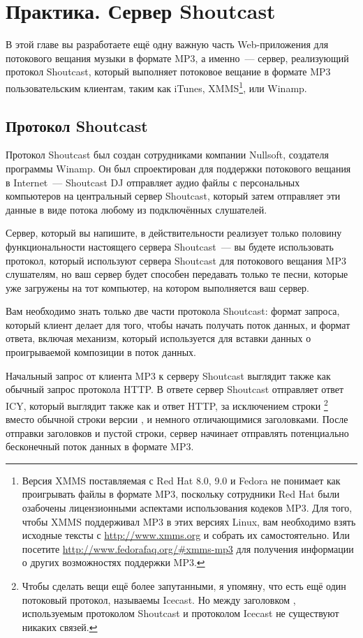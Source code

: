 \chapter{Практика. Сервер Shoutcast}
\label{ch:28}

В этой главе вы разработаете ещё одну важную часть Web-приложения для потокового вещания
музыки в формате MP3, а именно~--- сервер, реализующий протокол Shoutcast, который
выполняет потоковое вещание в формате MP3 пользовательским клиентам, таким как iTunes,
XMMS\footnote{Версия XMMS поставляемая с Red Hat 8.0, 9.0 и Fedora не понимает как
  проигрывать файлы в формате MP3, поскольку сотрудники Red Hat были озабочены
  лицензионными аспектами использования кодеков MP3.  Для того, чтобы XMMS поддерживал MP3
  в этих версиях Linux, вам необходимо взять исходные тексты с \url{http://www.xmms.org} и
  собрать их самостоятельно.  Или посетите \url{http://www.fedorafaq.org/#xmms-mp3} для
  получения информации о других возможностях поддержки MP3.}, или Winamp.

\section{Протокол Shoutcast}

Протокол Shoutcast был создан сотрудниками компании Nullsoft, создателя программы
Winamp. Он был спроектирован для поддержки потокового вещания в Internet~--- Shoutcast DJ
отправляет аудио файлы с персональных компьютеров на центральный сервер Shoutcast, который
затем отправляет эти данные в виде потока любому из подключённых слушателей.

Сервер, который вы напишите, в действительности реализует только половину функциональности
настоящего сервера Shoutcast~--- вы будете использовать протокол, который используют
сервера Shoutcast для потокового вещания MP3 слушателям, но ваш сервер будет способен
передавать только те песни, которые уже загружены на тот компьютер, на котором выполняется
ваш сервер.

Вам необходимо знать только две части протокола Shoutcast: формат запроса, который клиент
делает для того, чтобы начать получать поток данных, и формат ответа, включая механизм,
который используется для вставки данных о проигрываемой композиции в поток данных.

Начальный запрос от клиента MP3 к серверу Shoutcast выглядит также как обычный запрос
протокола HTTP.  В ответе сервер Shoutcast отправляет ответ ICY, который выглядит также
как и ответ HTTP, за исключением строки \footnote{Чтобы сделать вещи ещё более
  запутанными, я упомяну, что есть ещё один потоковый протокол, называемы Icecast. Но
  между заголовком , используемым протоколом Shoutcast и протоколом Icecast не
  существуют никаких связей.} вместо обычной строки версии , и немного
отличающимися заголовками. После отправки заголовков и пустой строки, сервер начинает
отправлять потенциально бесконечный поток данных в формате MP3.


